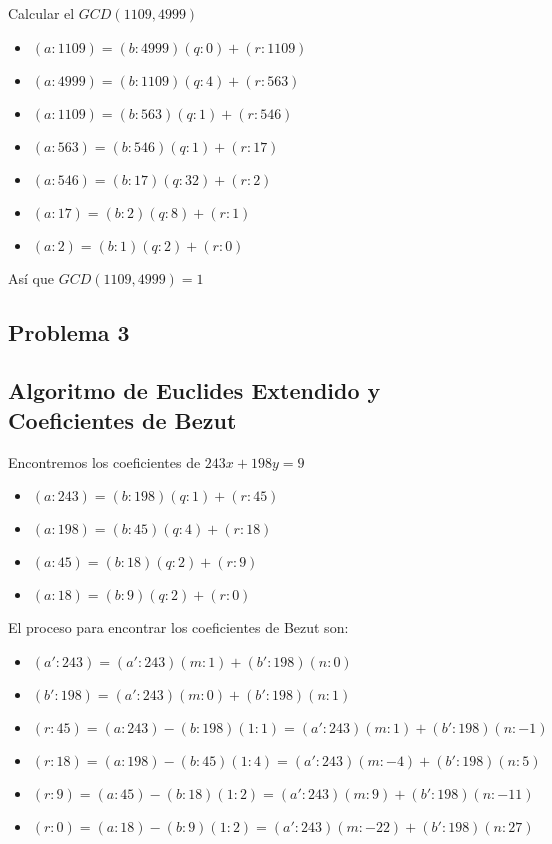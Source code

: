\documentclass[12pt, fleqn]{article}                             %
\begin{document}
            Calcular el $GCD(1109, 4999)$
            \begin{itemize}
                \item $(a:1109) = (b:4999)(q:0) + (r:1109)$
                \item $(a:4999) = (b:1109)(q:4) + (r:563)$
                \item $(a:1109) = (b:563)(q:1) + (r:546)$
                \item $(a:563) = (b:546)(q:1) + (r:17)$
                \item $(a:546) = (b:17)(q:32) + (r:2)$
                \item $(a:17) = (b:2)(q:8) + (r:1)$
                \item $(a:2) = (b:1)(q:2) + (r:0)$
            \end{itemize}                    
            Así que $GCD(1109, 4999) = 1$\\

    \clearpage
    \subsection{Problema 3}
    \subsection*{Algoritmo de Euclides Extendido y Coeficientes de Bezut}

            Encontremos los coeficientes de $243x + 198y = 9$
            \begin{itemize}
                \item $(a:243) = (b:198)(q:1) + (r:45)$
                \item $(a:198) = (b:45)(q:4) + (r:18)$
                \item $(a:45) = (b:18)(q:2) + (r:9)$
                \item $(a:18) = (b:9)(q:2) + (r:0)$ 
            \end{itemize}

            El proceso para encontrar los coeficientes de Bezut son:

            \begin{itemize}
                \item $(a':243) = (a':243)(m:1) + (b':198)(n:0)$
                \item $(b':198) = (a':243)(m:0) + (b':198)(n:1)$
            \end{itemize}

            \begin{itemize}
                \item $(r:45) = (a:243) - (b:198)(1:1)  =  (a':243)(m:1) + (b':198)(n:-1)$
                \item $(r:18) = (a:198) - (b:45)(1:4)  =  (a':243)(m:-4) + (b':198)(n:5)$
                \item $(r:9) = (a:45) - (b:18)(1:2)  =  (a':243)(m:9) + (b':198)(n:-11)$
                \item $(r:0) = (a:18) - (b:9)(1:2)  =  (a':243)(m:-22) + (b':198)(n:27)$
            \end{itemize}
\end{document}
